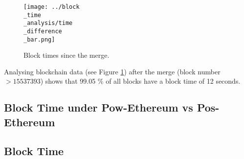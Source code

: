 \begin{figure}
  \centering
  \texttt{[image: ../block\\\_time\\\_analysis/time\\\_difference\\\_bar.png]}
  \caption{Block times since the merge.}
  \label{fig:block_time_analysis}
\end{figure}

Analysing blockchain data (see Figure \ref{fig:block_time_analysis}) after the
merge (block number $> 15537393$) shows that 99.05 \% of all blocks have a
block time of 12 seconds.


\subsection{Block Time under Pow-Ethereum vs Pos-Ethereum}
\subsection{Block Time}
